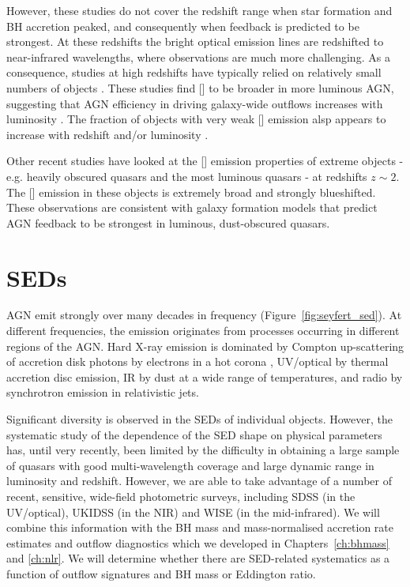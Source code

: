 However, these studies do not cover the redshift range when star formation and BH accretion peaked, and consequently when feedback is predicted to be strongest. 
At these redshifts the bright optical emission lines are redshifted to near-infrared wavelengths, where observations are much more challenging. 
As a consequence, studies at high redshifts have typically relied on relatively small numbers of objects \citep[e.g.][]{netzer04,sulentic04,shen16a}.
These studies find [] to be broader in more luminous AGN, suggesting that AGN efficiency in driving galaxy-wide outflows increases with luminosity \citep[e.g.][]{netzer04,nesvadba08,kim13,brusa15,carniani15,perna15,bischetti16}. 
The fraction of objects with very weak [] emission alsp appears to increase with redshift and/or luminosity \citep[e.g.][]{netzer04}. 

Other recent studies have looked at the [] emission properties of extreme objects - e.g. heavily obscured quasars \citep{zakamska16} and the most luminous quasars \citep{bischetti16} - at redshifts $z\sim2$. 
The [] emission in these objects is extremely broad and strongly blueshifted. 
These observations are consistent with galaxy formation models that predict AGN feedback to be strongest in luminous, dust-obscured quasars.
 
\section{SEDs}

\ac{AGN} emit strongly over many decades in frequency (Figure~\ref{fig:seyfert_sed}). 
At different frequencies, the emission originates from processes occurring in different regions of the \ac{AGN}. 
Hard X-ray emission is dominated by Compton up-scattering of accretion disk photons by electrons in a hot corona \citep[e.g.][]{sunyaev80}, \ac{UV}/optical by thermal accretion disc emission, \ac{IR} by dust at a wide range of temperatures, and radio by synchrotron emission in relativistic jets.   

Significant diversity is observed in the \ac{SED}s of individual objects. 
However, the systematic study of the dependence of the \ac{SED} shape on physical parameters has, until very recently, been limited by the difficulty in obtaining a large sample of quasars with good multi-wavelength coverage and large dynamic range in luminosity and redshift. 
However, we are able to take advantage of a number of recent, sensitive, wide-field photometric surveys, including SDSS (in the UV/optical), UKIDSS (in the \ac{NIR}) and WISE (in the mid-infrared).
We will combine this information with the \ac{BH} mass and mass-normalised accretion rate estimates and outflow diagnostics which we developed in Chapters~\ref{ch:bhmass} and \ref{ch:nlr}. 
We will determine whether there are \ac{SED}-related systematics as a function of outflow signatures and \ac{BH} mass or Eddington ratio. 

